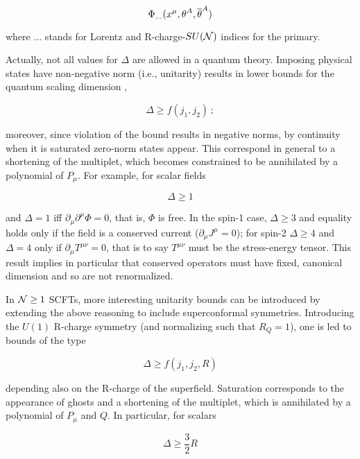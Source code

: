 \begin{equation}
	\Phi_{\ldots} (x^\mu , \theta^A, \overline{\theta}^A)
	\label{}
\end{equation}

where $\ldots$ stands for Lorentz and R-charge-$SU(\mathcal{N})$ indices for the primary.

Actually, not all values for $\Delta$ are allowed in a quantum theory. Imposing physical states have non-negative norm (i.e., unitarity) results in lower bounds for the quantum scaling dimension \cite{unitarity},

\begin{equation}
	\Delta \geq f(j_1,j_2)\,;
	\label{}
\end{equation}

moreover, since violation of the bound results in negative norms, by continuity when it is saturated zero-norm states appear. This correspond in general to a shortening of the multiplet, which becomes constrained to be annihilated by a polynomial of $P_\mu$. For example, for scalar fields

\begin{equation}
	\Delta \geq 1
	\label{uniboundscalar}
\end{equation}

and $\Delta = 1$ iff $\partial_\mu \partial^\mu \Phi = 0$, that is, $\Phi$ is free. In the spin-1 case, $\Delta \geq 3$ and equality holds only if the field is a conserved current ($\partial_\mu J^\mu = 0$); for spin-2 $\Delta \geq 4$ and $\Delta = 4$ only if $\partial_\mu T^{\mu\nu} = 0$, that is to say $T^{\mu\nu}$ must be the stress-energy tensor. This result implies in particular that conserved operators must have fixed, canonical dimension and so are not renormalized.

In $\mathcal{N} \geq 1$ SCFTs, more interesting unitarity bounds can be introduced by extending the above reasoning to include superconformal symmetries. Introducing the $U(1)$ R-charge symmetry (and normalizing such that $R_Q = 1$), one is led to bounds of the type

\begin{equation}
	\Delta \geq f(j_1,j_2,R)
	\label{}
\end{equation}

depending also on the R-charge of the superfield. Saturation corresponds to the appearance of ghosts and a shortening of the multiplet, which is annihilated by a polynomial of $P_\mu$ and $Q$. In particular, for scalars

\begin{equation}
	\Delta \geq \frac{3}{2} R
	\label{}
\end{equation}

